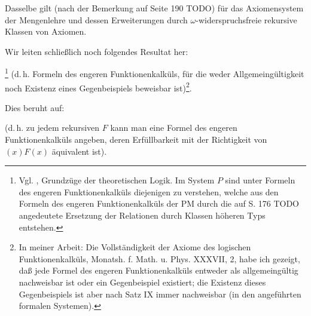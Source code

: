 \documentclass[draft]{scrartcl}
\begin{document}
\label{satzvii}

Dasselbe gilt (nach der Bemerkung auf Seite 190 TODO)
für das Axiomensystem der Mengenlehre und dessen Erweiterungen durch $\omega$-widerspruchsfreie rekursive
Klassen von Axiomen.

Wir leiten schließlich noch folgendes Resultat her:

\footnote{Vgl. , Grundzüge der theoretischen Logik. Im System $P$ sind unter Formeln des engeren Funktionenkalküls diejenigen zu verstehen, welche aus den Formeln des engeren Funktionenkalküls der PM durch die auf S. 176 TODO angedeutete Ersetzung der Relationen durch Klassen höheren Typs entstehen.}
(d.\,h. Formeln des engeren Funktionenkalküls, für die weder Allgemeingültigkeit noch Existenz eines Gegenbeispiels beweisbar ist)\footnote{In meiner Arbeit: Die Vollständigkeit der Axiome des logischen Funktionenkalküls, Monatsh. f. Math. u. Phys. XXXVII, 2, habe ich gezeigt, daß jede Formel des engeren Funktionenkalküls entweder als allgemeingültig nachweisbar ist oder ein Gegenbeispiel existiert; die Existenz dieses Gegenbeispiels ist aber nach Satz IX  immer nachweisbar (in den angeführten formalen Systemen).}.

Dies beruht auf:

 (d.\,h. zu jedem rekursiven $F$ kann man eine Formel des engeren Funktionenkalküls angeben, deren Erfüllbarkeit mit der Richtigkeit von $\left(x\right)F\left(x\right)$ äquivalent ist).
\end{document}
